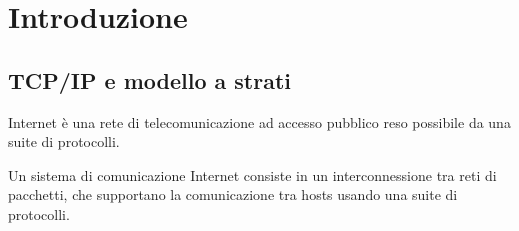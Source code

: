 
\chapter{Introduzione}


\section{TCP/IP e modello a strati}







Internet è una rete di telecomunicazione ad accesso pubblico reso possibile da una suite di protocolli.

Un sistema di comunicazione Internet consiste in un interconnessione tra reti di pacchetti, che supportano la comunicazione tra hosts usando una suite di protocolli.


